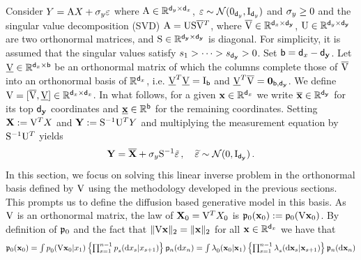 Consider $Y = \mathrm{A} X + \sigma_y \varepsilon$
where $\mathrm{A} \in \mathbb{R}^{\mathsf{d}_y \times {\mathsf{d}_x}}$, 
$\varepsilon \sim \mathcal{N}(0_{\mathsf{d}_y}, \mathrm{I}_{\mathsf{d}_y})$ and $\sigma_y \geq 0$ and the singular value decomposition (SVD) $\mathrm{A} = \mathrm{U} \mathrm{S} \smash{\mathrm{\overline{V}}}^T$,
where $\mathrm{\overline{V}} \in \mathbb{R}^{{\mathsf{d}_x} \times {\mathsf{d}_{\mathbf{y}}}}$, $\mathrm{U} \in \mathbb{R}^{\mathsf{d}_y \times {\mathsf{d}_{\mathbf{y}}}}$ are two orthonormal matrices, 
and $\mathrm{S} \in \mathbb{R}^{{\mathsf{d}_{\mathbf{y}}} \times {\mathsf{d}_{\mathbf{y}}}}$ is diagonal. 
For simplicity, it is assumed that the singular values satisfy $s_1 > \cdots > s_{\mathsf{d}_{\mathbf{y}}} > 0$.
Set $\mathsf{b}= {\mathsf{d}_x} - {\mathsf{d}_{\mathbf{y}}}$. 
Let $\mathrm{\underline{V}} \in \mathbb{R}^{{\mathsf{d}_x} \times \mathsf{b}}$ be an orthonormal matrix of which the columns complete those of $\mathrm{\overline{V}}$ into an orthonormal basis of $\mathbb{R}^{{\mathsf{d}_x}}$, i.e. $\mathrm{\underline{V}}^T \mathrm{\underline{V}}= \operatorname{I}_{\mathsf{b}}$ 
and $\mathrm{\underline{V}}^T \mathrm{\overline{V}}=\mathbf{0}_{\mathsf{b}, {\mathsf{d}_{\mathbf{y}}}}$. We define $\mathrm{V}= [\mathrm{\overline{V}}, \mathrm{\underline{V}}] \in \mathbb{R}^{{\mathsf{d}_x} \times {\mathsf{d}_x}}$. In what follows, for a given $\mathbf{x} \in \mathbb{R}^{\mathsf{d}_x}$ we write $\overline{\mathbf{x}} \in \mathbb{R}^{\mathsf{d}_{\mathbf{y}}}$ for its top ${\mathsf{d}_{\mathbf{y}}}$ coordinates and $\underline{\mathbf{x}} \in \mathbb{R}^{\mathsf{b}}$ for the remaining coordinates.
Setting $\mathbf{X} := \mathrm{V}^T X$ and $\mathbf{Y} := \mathrm{S}^{-1} \mathrm{U}^T Y$ and multiplying the measurement equation by $\mathrm{S}^{-1} \mathrm{U}^T$ yields
\[ 
    \mathbf{Y} =  \smash{\overline{\mathbf{X}}} + \sigma_y \mathrm{S}^{-1} \tilde{\varepsilon} \,, \quad \widetilde{\varepsilon} \sim \mathcal{N}(0, \operatorname{I}_{{\mathsf{d}_{\mathbf{y}}}}) \,.
\]
In this section, we focus on solving this linear inverse problem in the orthonormal basis defined by $\mathrm{V}$ using the methodology developed in the previous sections.
This prompts us to define the diffusion based generative model in this basis.
As $\mathrm{V}$ is an orthonormal matrix, the law of $\mathbf{X}_0 = \mathrm{V}^T X_0$ is $\bwmargV{0}{\ltrstate_0} \eqdef \bwmarg{0}{\m{V} \ltrstate_0}$.
By definition of $\bwmargV{0}{}$ and the fact that $\|\mathrm{V} \mathbf{x} \|_2 =  \| \mathbf{x} \|_2$ for all $\mathbf{x} \in \mathbb{R}^{{\mathsf{d}_x}}$ we have that
\begin{equation*}
  \textstyle \bwmargV{0}{\ltrstate_0} = \int \bwtrans{}{0}{\lstate_1} {\m{V} \ltrstate_0} \left\{ \prod_{s = 1}^{n-1} \bwtrans{}{s}{\lstate_{s+1}}{\rmd \lstate_s} \right\} \bwmarg{n}{\rmd \lstate_n}
  = \int \bwtransV{}{0}{\ltrstate_1}{\ltrstate_0} \left\{ \prod_{s = 1}^{n-1} \bwtransV{}{s}{\ltrstate_{s+1}}{\rmd \ltrstate_s} \right\} \bwmargV{n}{\rmd \ltrstate_n}
\end{equation*}
